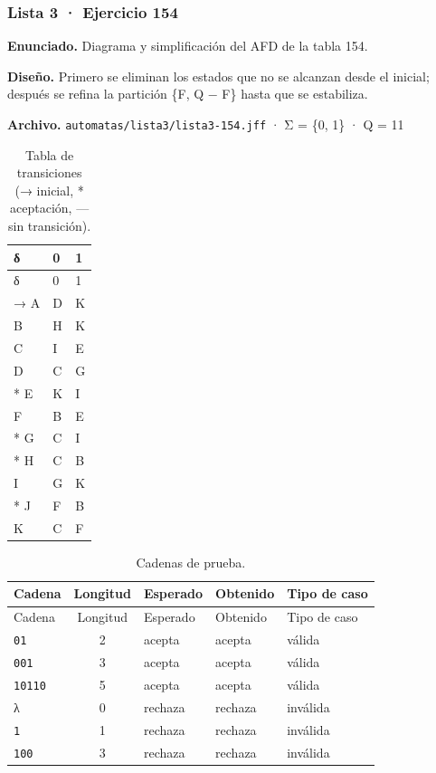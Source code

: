 
\hypertarget{lista-3-ejercicio-154}{%
\subsubsection{Lista 3 · Ejercicio 154}\label{lista-3-ejercicio-154}}

\textbf{Enunciado.} Diagrama y simplificación del AFD de la tabla 154.

\textbf{Diseño.} Primero se eliminan los estados que no se alcanzan desde el inicial; después se refina la partición \{F, Q − F\} hasta que se estabiliza.

\textbf{Archivo.} \texttt{automatas/lista3/lista3-154.jff} · Σ = \{0, 1\} · \textbar Q\textbar{} = 11

\begin{longtable}[]{@{}lll@{}}
\caption{Tabla de transiciones (→ inicial, * aceptación, --- sin transición).}\tabularnewline
\toprule\noalign{}
δ & 0 & 1 \\
\midrule\noalign{}
\endfirsthead
\toprule\noalign{}
δ & 0 & 1 \\
\midrule\noalign{}
\endhead
\bottomrule\noalign{}
\endlastfoot
→ A & D & K \\
B & H & K \\
C & I & E \\
D & C & G \\
* E & K & I \\
F & B & E \\
* G & C & I \\
* H & C & B \\
I & G & K \\
* J & F & B \\
K & C & F \\
\end{longtable}

\begin{longtable}[]{@{}lclll@{}}
\caption{Cadenas de prueba.}\tabularnewline
\toprule\noalign{}
Cadena & Longitud & Esperado & Obtenido & Tipo de caso \\
\midrule\noalign{}
\endfirsthead
\toprule\noalign{}
Cadena & Longitud & Esperado & Obtenido & Tipo de caso \\
\midrule\noalign{}
\endhead
\bottomrule\noalign{}
\endlastfoot
\texttt{01} & 2 & acepta & acepta & válida \\
\texttt{001} & 3 & acepta & acepta & válida \\
\texttt{10110} & 5 & acepta & acepta & válida \\
λ & 0 & rechaza & rechaza & inválida \\
\texttt{1} & 1 & rechaza & rechaza & inválida \\
\texttt{100} & 3 & rechaza & rechaza & inválida \\
\end{longtable}

